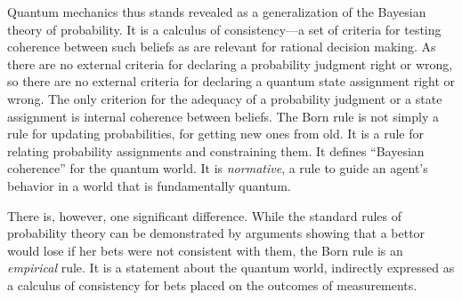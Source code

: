 \documentclass[smallextended]{svjour3}
\begin{document}
Quantum mechanics thus stands revealed as a generalization of the Bayesian theory of probability. It is a calculus of consistency---a set of criteria for testing coherence between such beliefs as are relevant for rational decision making. As there are no {external} criteria for declaring a probability judgment right or wrong, so there are no {external} criteria for declaring a quantum state assignment right or wrong. The only criterion for the adequacy of a probability judgment or a state assignment is internal coherence between beliefs. The Born rule is not simply a rule for {updating} probabilities, for getting new ones from old. It is a rule for {relating} probability assignments and {constraining} them. It defines ``Bayesian coherence'' for the quantum world. It is \emph{normative}, a rule to guide an agent's behavior in a world that is fundamentally quantum.

There is, however, one significant difference. While the standard rules of probability theory can be demonstrated by arguments showing that a bettor would lose if her bets were not consistent with them, the Born rule is an \emph{empirical} rule. It is a statement about the quantum world, indirectly expressed as a calculus of consistency for bets placed on the outcomes of measurements.
\end{document}
